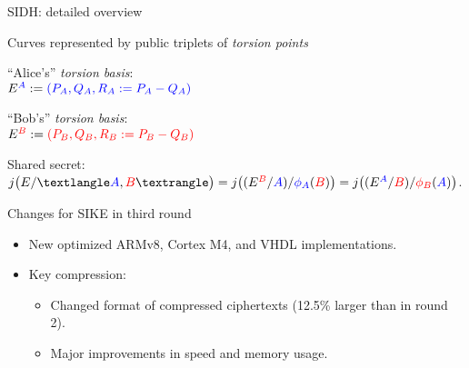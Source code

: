\documentclass[aspectratio=169]{beamer}
\newcommand{\cyc}[1]{{〈 #1 〉}}
\newcommand{\bl}[1]{\textcolor{blue}{#1}}
\newcommand{\rd}[1]{\textcolor{red}{#1}}
\begin{document}

\begin{frame}{SIDH: detailed overview}
  \begin{center}
    Curves represented by public triplets of \textit{torsion points}
  \end{center}
  \begin{minipage}{0.45\linewidth}
      ``Alice's'' \textit{torsion basis}:\\
      $E^{\bl{A}} := \bl{(P_A, Q_A, R_A:=P_A-Q_A)}$
  \end{minipage}
  \hfill
  \begin{minipage}{0.45\linewidth}
    \begin{flushright}
      ``Bob's'' \textit{torsion basis}:\\
      $E^{\rd{B}} := \rd{(P_B, Q_B, R_B:=P_B-Q_B)}$
    \end{flushright}
  \end{minipage}

  \begin{center}

    \bigskip
    Shared secret:\\
    $j\bigl(E/\cyc{\bl{A},\rd{B}}\bigr) =
    j\bigl((E^{\rd{B}}/\bl{A})/\bl{\phi_A}(\rd{B})\bigr) =
    j\bigl((E^{\bl{A}}/\rd{B})/\rd{\phi_B}(\bl{A})\bigr)$.
  \end{center}
\end{frame}


\begin{frame}{Changes for SIKE in third round}
  \begin{itemize}
  \item New optimized ARMv8, Cortex M4, and VHDL implementations.
  \item Key compression:
    \begin{itemize}
    \item Changed format of compressed ciphertexts (12.5\% larger than in round 2).
    \item Major improvements in speed and memory usage.
    \end{itemize}
  \end{itemize}
\end{frame}
\end{document}
